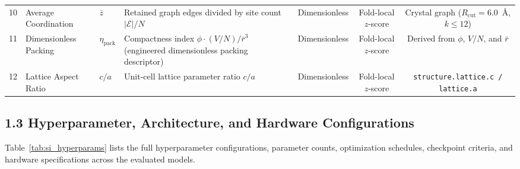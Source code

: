 \documentclass[journal,article,submit,moreauthors,pdftex]{article}
\begin{document}
\begin{table}[htbp]
{\begin{tabular}{cllllcc}
10 & Average Coordination & $\bar{z}$ & Retained graph edges divided by site count $|\mathcal{E}|/N$ & Dimensionless & Fold-local $z$-score & Crystal graph ($R_{\mathrm{cut}} = 6.0$~\AA, $k \le 12$) \\
11 & Dimensionless Packing & $\eta_{\mathrm{pack}}$ & Compactness index $\phi \cdot (V/N)/\bar{r}^3$ (engineered dimensionless packing descriptor) & Dimensionless & Fold-local $z$-score & Derived from $\phi$, $V/N$, and $\bar{r}$ \\
12 & Lattice Aspect Ratio & $c/a$ & Unit-cell lattice parameter ratio $c / a$ & Dimensionless & Fold-local $z$-score & \texttt{structure.lattice.c / lattice.a} \\
\bottomrule
\end{tabular}%
}
\end{table}

\subsection*{1.3 Hyperparameter, Architecture, and Hardware Configurations}
Table~\ref{tab:si_hyperparams} lists the full hyperparameter configurations, parameter counts, optimization schedules, checkpoint criteria, and hardware specifications across the evaluated models.
\end{document}
